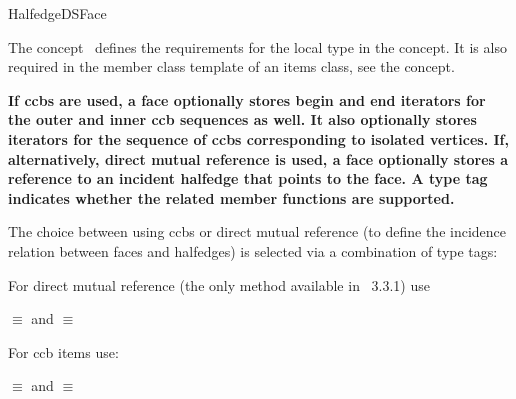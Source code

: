 
\ccRefPageBegin



\begin{ccRefConcept}{HalfedgeDSFace}
\label{pageHalfedgeDSItemsFaceRef}

\ccDefinition
  
The concept \ccRefName\ defines the requirements for the local  
type in the  concept. It is also required in 
the  member class template of an
items class, see the  concept.





{\bf\ttfamily
If ccbs are used, a face optionally stores begin and end iterators for the outer and inner ccb sequences
as well. It also optionally stores iterators for the sequence of ccbs corresponding to isolated vertices.
If, alternatively, direct mutual reference is used, a face optionally stores a reference 
to an incident halfedge that points to the face.
A type tag indicates whether the related member functions are supported. 
}

{\bf\ttfamily

The choice between using ccbs or direct mutual reference
(to define the incidence relation between faces and halfedges) is selected 
via a combination of type tags:

For direct mutual reference (the only method available in \cgal\ 3.3.1) use

 $\equiv$  
and
 $\equiv$  

For ccb items use:

 $\equiv$  
and
 $\equiv$  
 
}


\end{ccRefConcept}
